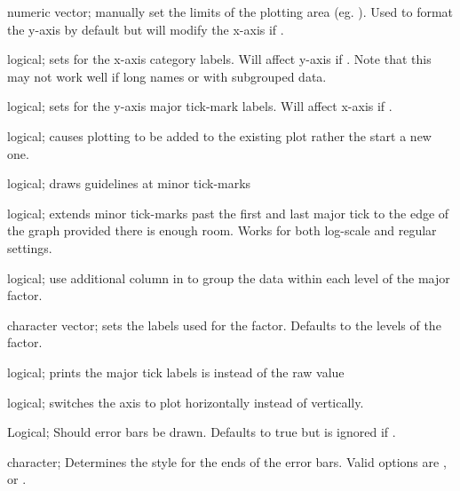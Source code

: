 \documentclass[a4paper]{book}
\begin{document}
\begin{Arguments}
\begin{ldescription}
\item[\code{yLim}] numeric vector; manually set the limits of the plotting area (eg. ). Used to format the y-axis by default but will modify the x-axis if .

\item[\code{rotateLabels}] logical; sets  for the x-axis category labels. Will affect y-axis if . Note that this may not work well if long names or with subgrouped data.

\item[\code{rotateY}] logical; sets  for the y-axis major tick-mark labels. Will affect x-axis if .

\item[\code{add}] logical; causes plotting to be added to the existing plot rather the start a new one.

\item[\code{minorGuides}] logical; draws guidelines at minor tick-marks

\item[\code{extendTicks}] logical; extends minor tick-marks past the first and last major tick to the edge of the graph provided there is enough room. Works for both log-scale and regular settings.

\item[\code{subGroup}] logical; use additional column in  to group the data within each level of the major factor.

\item[\code{subGroupLabels}] character vector; sets the labels used for the  factor. Defaults to the levels of the factor.

\item[\code{expLabels}] logical; prints the major tick labels is  instead of the raw value

\item[\code{sidePlot}] logical; switches the axis to plot horizontally instead of vertically.

\item[\code{errorBars}] Logical; Should error bars be drawn. Defaults to true but is ignored if .

\item[\code{errorCap}] character; Determines the style for the ends of the error bars. Valid options are ,  or .


\end{ldescription}
\end{Arguments}
\end{document}
